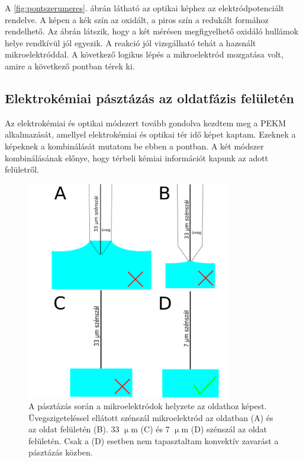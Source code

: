 A \ref{fig:pontszerumeres}. ábrán látható az optikai képhez az elektródpotenciált rendelve. A képen a kék szín az oxidált, a piros szín a redukált formához rendelhető. Az ábrán látszik, hogy a két mérésen megfigyelhető oxidáló hullámok helye rendkívül jól egyezik. A reakció jól vizsgálható tehát a hazsnált mikroelektróddal. A következő logikus lépés a mikroelektród mozgatása volt, amire a következő pontban térek ki.

\subsection{Elektrokémiai pásztázás az oldatfázis felületén}
Az elektrokémiai és optikai módszert tovább gondolva kezdtem meg a PEKM alkalmazását, amellyel elektrokémiai és optikai tér idő képet kaptam. Ezeknek a képeknek a kombinálását mutatom be ebben a pontban. A két módszer kombinálásának előnye, hogy térbeli kémiai információt kapunk az adott felületről.
\begin{figure}[h!]
\centering
\includegraphics[width=0.8\textwidth]{img/oldat.png}
\caption{A pásztázás során a mikroelektródok helyzete az oldathoz képest. Üvegszigeteléssel ellátott szénszál mikroelektród az oldatban (A) és az oldat felületén (B). 33 $\upmu$m (C) és 7 $\upmu$m (D) szénszál az oldat felületén. Csak a (D) esetben nem tapasztaltam konvektív zavarást a pásztázás közben.}
\label{fig:oldat}
\end{figure}
